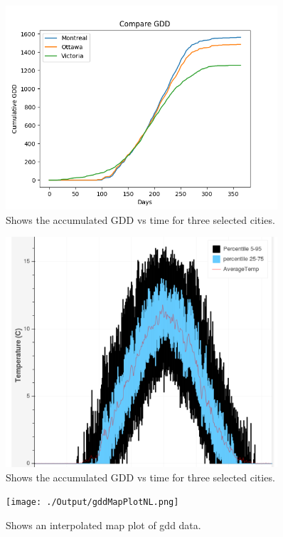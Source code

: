 \documentclass[12pt]{article}
\begin{document}
	\begin{figure}[!htbp]
		\centering
		\includegraphics[width=0.9\textwidth]{./Output/CumulativeGDD.png} 
		\caption{\scriptsize Shows the accumulated GDD vs time for three selected cities.}\label{GDDplot}		  
	\end{figure}

	\begin{figure}[!htbp]
		\centering
		\includegraphics[width=0.9\textwidth]{./Report/GDDstats.png} 
		\caption{\scriptsize Shows the accumulated GDD vs time for three selected cities.}\label{GDDplot}		  
	\end{figure}


	\begin{figure}[!htbp]
		\centering
		\texttt{[image: ./Output/gddMapPlotNL.png]} 
		\caption{\scriptsize Shows an interpolated map plot of gdd data.}\label{gddMapNl}		  
	\end{figure}
\end{document}
